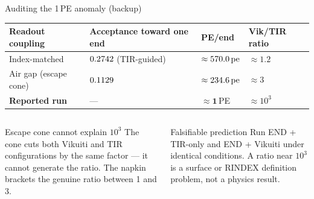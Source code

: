 \documentclass[aspectratio=169,9pt]{beamer}
\begin{document}
\begin{frame}{Auditing the 1\,PE anomaly (backup)}
  \begin{center}
  {\footnotesize
  \setlength{\tabcolsep}{4pt}
  \begin{tabular}{@{}p{3.5cm}p{3.4cm}p{2.0cm}p{2.0cm}@{}}
    \toprule
    Readout coupling & Acceptance toward one end & PE/end & Vik/TIR ratio\\
    \midrule
    Index-matched & $0.2742$ (TIR-guided) & $\approx570.0\,\text{pe}$ & $\approx 1.2$\\
    Air gap (escape cone) & $0.1129$ & $\approx234.6\,\text{pe}$ & $\approx 3$\\
    \rowcolor{rowhl}
    \textbf{Reported run} & — & $\approx\mathbf{1}$\,PE & $\approx 10^3$\\
    \bottomrule
  \end{tabular}}
  \end{center}
  \vspace{4pt}
  \begin{columns}[T]
      \begin{block}{Escape cone cannot explain $10^3$}
        {\small The cone cuts both Vikuiti and TIR configurations by
        the same factor — it cannot generate the ratio.
        The napkin brackets the genuine ratio between 1 and 3.}
      \end{block}
      \begin{alertblock}{Falsifiable prediction}
        {\small Run END + TIR-only and END + Vikuiti under identical conditions.
        A ratio near $10^3$ is a surface or RINDEX definition problem,
        not a physics result.}
      \end{alertblock}
  \end{columns}
\end{frame}
\end{document}
